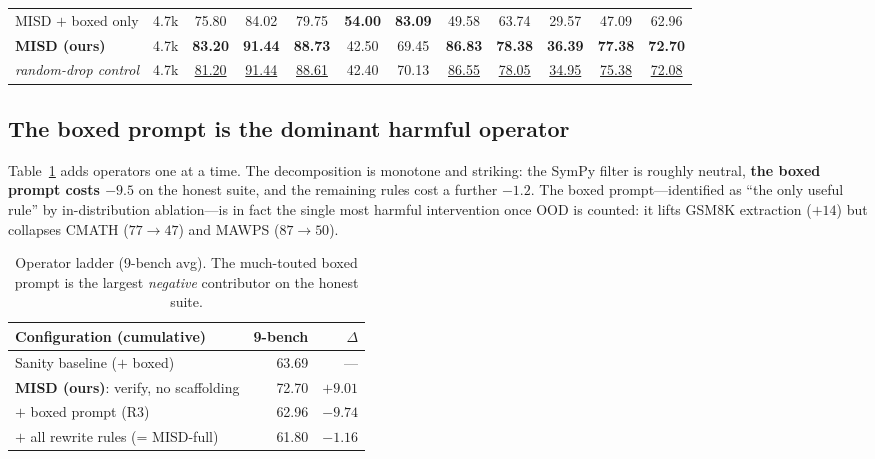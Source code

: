 \documentclass[letterpaper]{article} %
\newcommand{\good}[1]{\textcolor{misdgreen}{#1}}
\newcommand{\bad}[1]{\textcolor{misdred}{#1}}
\begin{document}
\begin{table}[t]
\begin{tabular}{l c ccccc cccc c}
\;\;\; MISD $+$ boxed only & 4.7k & 75.80 & 84.02 & 79.75 & \textbf{54.00} & \textbf{83.09} & 49.58 & 63.74 & 29.57 & 47.09 & 62.96\\
\textbf{MISD (ours)}       & 4.7k & \textbf{83.20} & \textbf{91.44} & \textbf{88.73} & 42.50 & 69.45 & \textbf{86.83} & \textbf{78.38} & \textbf{36.39} & \textbf{77.38} & \good{\textbf{72.70}}\\
\;\;\; \textit{random-drop control} & 4.7k & \underline{81.20} & \underline{91.44} & \underline{88.61} & 42.40 & 70.13 & \underline{86.55} & \underline{78.05} & \underline{34.95} & \underline{75.38} & \underline{72.08}\\
\bottomrule
\end{tabular}
\end{table}

\subsection{The boxed prompt is the dominant harmful operator}
Table~\ref{tab:ladder} adds operators one at a time. The decomposition is monotone and striking: the SymPy filter is roughly neutral, \textbf{the boxed prompt costs $-9.5$} on the honest suite, and the remaining rules cost a further $-1.2$. The boxed prompt---identified as ``the only useful rule'' by in-distribution ablation---is in fact the single most harmful intervention once OOD is counted: it lifts GSM8K extraction ($+14$) but collapses CMATH ($77\rightarrow47$) and MAWPS ($87\rightarrow50$).

\begin{table}[h]\centering\small
\caption{Operator ladder (9-bench avg). The much-touted boxed prompt is the largest \emph{negative} contributor on the honest suite.}
\label{tab:ladder}
\begin{tabular}{lrr}
\toprule
Configuration (cumulative) & 9-bench & $\Delta$\\
\midrule
Sanity baseline ($+$ boxed)        & 63.69 & ---\\
\textbf{MISD (ours)}: verify, no scaffolding & \good{72.70} & \good{$+9.01$}\\
\;\; $+$ boxed prompt (R3)         & 62.96 & \bad{$-9.74$}\\
\;\; $+$ all rewrite rules (= MISD-full) & 61.80 & \bad{$-1.16$}\\
\bottomrule
\end{tabular}
\end{table}
\end{document}
